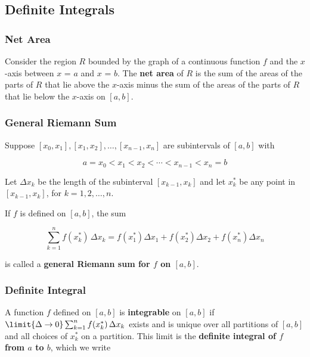 %
%
%

\subsection{Definite Integrals}
\subsubsection{Net Area}
Consider the region $R$ bounded by the graph of a continuous function $f$ and the $x$-axis between $x$ = $a$ and $x$ = $b$. The \textbf{net area} of $R$ is the sum of the areas of the parts of $R$ that lie above the $x$-axis minus the sum of the areas of the parts of $R$ that lie below the $x$-axis on $[a, b]$.

\subsubsection{General Riemann Sum}
Suppose $[x_0, x_1], [x_1, x_2], \ldots, [x_{n-1}, x_n]$ are subintervals of $[a, b]$ with 

\begin{equation}
    a = x_0 < x_1 < x_2 < \cdots < x_{n - 1} < x_n = b
\end{equation}

Let $\Delta x_k$ be the length of the subinterval $[x_{k - 1}, x_k]$ and let $x_k ^*$ be any point in $[x_{k - 1}, x_k]$, for $k = 1, 2, \ldots, n$.

If $f$ is defined on $[a, b]$, the sum

\begin{equation}
    \sum _{k = 1} ^{n} f(x_k ^*)\, \Delta x_k = f(x_1 ^*) \Delta x_1 + 
f(x_2 ^*) \Delta x_2 + f(x_n ^*) \Delta x_n
\end{equation}

is called a \textbf{general Riemann sum for $f$ on $[a, b]$}.

\subsubsection{Definite Integral}
A function $f$ defined on $[a, b]$ is \textbf{integrable} on $[a, b]$ if $\limit{\Delta \rightarrow 0} \sum _{k = 1} ^n f(x_k ^*)\, \Delta x_k$ exists and is unique over all partitions of $[a, b]$ and all choices of $x_k ^*$ on a partition. This limit is the \textbf{definite integral of $f$ from $a$ to $b$}, which we write

